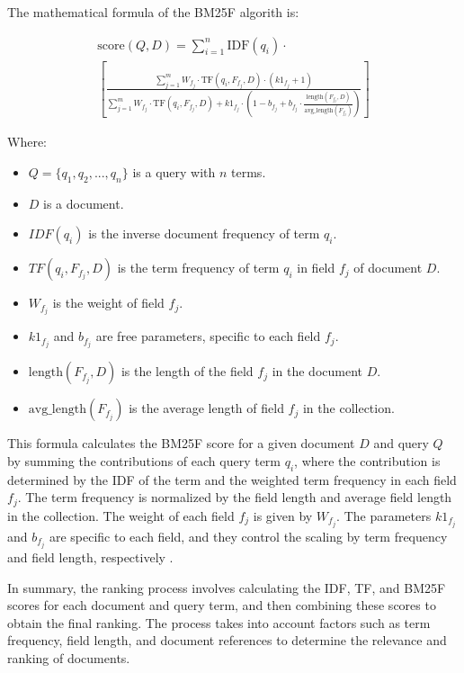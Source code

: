 \documentclass{article}
\begin{document}
The mathematical formula of the BM25F algorith is:

\begin{multline}
    \text{{score}}(Q, D) = \sum_{i=1}^{n} \text{{IDF}}(q_i) \cdot \\
    \left[ \frac{\sum_{j=1}^{m} W_{f_j} \cdot \text{{TF}}(q_i, F_{f_j}, D) \cdot (k1_{f_j} + 1)}{\sum_{j=1}^{m} W_{f_j} \cdot \text{{TF}}(q_i, F_{f_j}, D) + k1_{f_j} \cdot (1 - b_{f_j} + b_{f_j} \cdot \frac{\text{{length}}(F_{f_j}, D)}{\text{{avg\_length}}(F_{f_j})})} \right]
\end{multline}

Where:
\begin{itemize}
  \item $Q = \{q_1, q_2, ..., q_n\}$ is a query with $n$ terms.
  \item $D$ is a document.
  \item $IDF(q_i)$ is the inverse document frequency of term $q_i$.
  \item $TF(q_i, F_{f_j}, D)$ is the term frequency of term $q_i$ in field $f_j$ of document $D$.
  \item $W_{f_j}$ is the weight of field $f_j$.
  \item $k1_{f_j}$ and $b_{f_j}$ are free parameters, specific to each field $f_j$.
  \item $\text{{length}}(F_{f_j}, D)$ is the length of the field $f_j$ in the document $D$.
  \item $\text{{avg\_length}}(F_{f_j})$ is the average length of field $f_j$ in the collection.
\end{itemize}

This formula calculates the BM25F score for a given document $D$ and query $Q$ by summing 
the contributions of each query term $q_i$, where the contribution is determined by the IDF of 
the term and the weighted term frequency in each field $f_j$. The term frequency is normalized
by the field length and average field length in the collection. The weight of each field $f_j$ is
given by $W_{f_j}$. The parameters $k1_{f_j}$ and $b_{f_j}$ are specific to each field, and they control the 
scaling by term frequency and field length, respectively \cite{rostami2022investigating}. 

In summary, the ranking process involves calculating the IDF, TF, and BM25F \cite{PJAGIF10} 
scores for each 
document and query term, and then combining these scores to obtain the final ranking. The 
process takes into account factors such as term frequency, field length, and document references 
to determine the relevance and ranking of documents.
\end{document}
